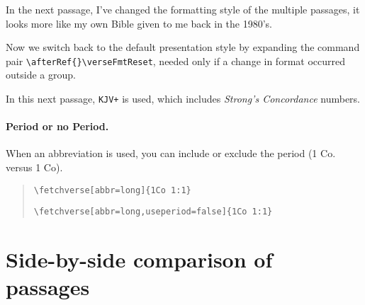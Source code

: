 \documentclass{article}
\begin{document}
In the next passage, I've changed the formatting style of the multiple
passages, it looks more like my own Bible given to me back in the 1980's.

\begin{quote}
\end{quote}

\medskip\noindent Now we switch back to the default presentation style
by expanding the command pair \verb|\afterRef{}\verseFmtReset|, needed only if a change
in format occurred outside a group.

\afterRef{}\verseFmtReset

\begin{quote}
\end{quote}

\noindent
{}

\begin{quote}
\end{quote}

\noindent
In this next passage, \texttt{KJV+} is used, which includes \textsl{Strong's
Concordance} numbers.\\[3pt]


\paragraph*{Period or no Period.} When an abbreviation is used, you can include
or exclude the period (1 Co. versus 1 Co).
\begin{quote}
\verb|\fetchverse[abbr=long]{1Co 1:1}|\\[3pt]

\verb|\fetchverse[abbr=long,useperiod=false]{1Co 1:1}|\\[3pt]
\end{quote}

\section{Side-by-side comparison of passages}
\end{document}
